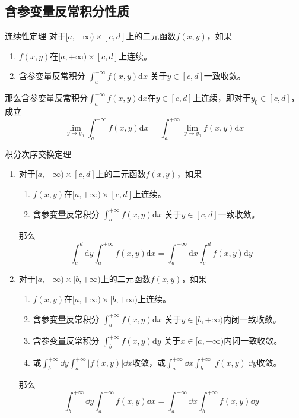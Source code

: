 \documentclass[lang = cn, scheme = chinese, thmcnt = section]{elegantbook}
\newcommand{\dis}{\displaystyle}
\begin{document}
\subsection{含参变量反常积分性质}

\begin{theorem}{连续性定理}
	对于$[a,+\infty)\times[c,d]$上的二元函数$f(x,y)$，如果
	\begin{enumerate}
		\item $f(x,y)$在$[a,+\infty)\times[c,d]$上连续。
		\item 含参变量反常积分
		$\dis\int_{a}^{+\infty}{f(x,y)\mathrm{d}x}$
		关于$y\in[c,d]$一致收敛。
	\end{enumerate}
	那么含参变量反常积分$\dis\int_{a}^{+\infty}{f(x,y)\mathrm{d}x}$在$y\in[c,d]$上连续，即对于$y_0\in[c,d]$，成立
	$$
	\lim_{y\to y_0}{\int_{a}^{+\infty}{f(x,y)\mathrm{d}x}}=\int_{a}^{+\infty}{\lim_{y\to y_0}{f(x,y)\mathrm{d}x}}
	$$
\end{theorem}

\begin{theorem}{积分次序交换定理}
	\begin{enumerate}
		\item 对于$[a,+\infty)\times[c,d]$上的二元函数$f(x,y)$，如果
		\begin{enumerate}
			\item $f(x,y)$在$[a,+\infty)\times[c,d]$上连续。
			\item 含参变量反常积分
			$\dis\int_{a}^{+\infty}{f(x,y)\mathrm{d}x}$
			关于$y\in[c,d]$一致收敛。
		\end{enumerate}
		那么
		$$
		\int_{c}^{d}{\mathrm{d}y\int_{a}^{+\infty}{f(x,y)\mathrm{d}x}}=\int_{a}^{+\infty}{\mathrm{d}x\int_{c}^{d}{f(x,y)\mathrm{d}y}}
		$$
		\item 对于$[a,+\infty)\times[b,+\infty)$上的二元函数$f(x,y)$，如果
		\begin{enumerate}
			\item $f(x,y)$在$[a,+\infty)\times[b,+\infty)$上连续。
			\item 含参变量反常积分
			$\dis\int_{a}^{+\infty}{f(x,y)\mathrm{d}x}$
			关于$y\in[b,+\infty)$内闭一致收敛。
			\item 含参变量反常积分
			$\dis\int_{b}^{+\infty}{f(x,y)\mathrm{d}y}$
			关于$x\in[a,+\infty)$内闭一致收敛。
			\item 或$\dis\int_{b}^{+\infty}\dd y\int_{a}^{+\infty}|f(x,y)|\dd x$收敛，或$\dis\int_{a}^{+\infty}\dd x\int_{b}^{+\infty}|f(x,y)|\dd y$收敛。
		\end{enumerate}
		那么
		$$
		\dis\int_{b}^{+\infty}\dd y\int_{a}^{+\infty}f(x,y)\dd x
		=
		\int_{a}^{+\infty}\dd x\int_{b}^{+\infty}f(x,y)\dd y
		$$
	\end{enumerate}
\end{theorem}
\end{document}
